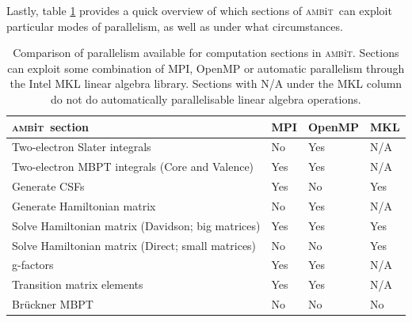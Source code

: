 \documentclass{report}
\newcommand{\ambit}{\textsc{amb}{\footnotesize i}\textsc{t}}
\begin{document}
Lastly, table \ref{tab:parallelism} provides a quick overview of which sections of \ambit\ can exploit
particular modes of parallelism, as well as under what circumstances.


\begin{table}
\label{tab:parallelism}
\caption{Comparison of parallelism available for computation sections in \ambit. Sections can exploit
some combination of MPI, OpenMP or automatic parallelism through the Intel MKL linear algebra library.
Sections with N/A under the MKL column do not do automatically parallelisable linear algebra operations.}
\begin{tabular}{l l l l}
\hline
\ambit\ section & MPI   &OpenMP  &MKL\\
\hline
\hline
Two-electron Slater integrals   &No &Yes &N/A\\
Two-electron MBPT integrals (Core and Valence) &Yes    &Yes    &N/A\\
Generate CSFs   &Yes    &No &Yes\\
Generate Hamiltonian matrix     &No &Yes    &N/A\\
Solve Hamiltonian matrix (Davidson; big matrices) &Yes    &Yes    &Yes\\
Solve Hamiltonian matrix (Direct; small matrices)   &No &No &Yes\\
g-factors   &Yes    &Yes    &N/A\\
Transition matrix elements  &Yes    &Yes    &N/A\\
Br\"{u}ckner MBPT   &No &No &No\\
\hline
\end{tabular}
\end{table}
\end{document}

